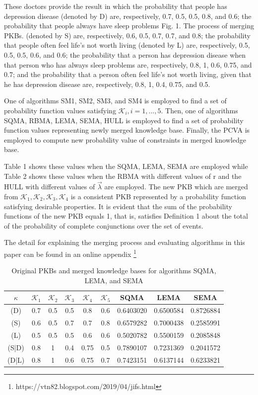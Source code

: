 \documentclass[]{iosart2c}
\begin{document}
  These doctors provide the result in which the probability that people has depression disease (denoted by D) are, respectively, 0.7, 0.5, 0.5, 0.8, and 0.6; the probability that people always have sleep problems Fig. 1. The process of merging PKBs.
  (denoted by S) are, respectively, 0.6, 0.5, 0.7, 0.7, and 0.8; the probability that people often feel life’s not worth living (denoted by L) are, respectively, 0.5, 0.5, 0.5, 0.6, and 0.6; the probability that a person has depression disease when that person who has always sleep problems are, respectively, 0.8, 1, 0.6, 0.75, and 0.7; and the probability that a person often feel life’s not worth living, given that he has depression disease are, respectively, 0.8, 1, 0.4, 0.75, and 0.5.

  One of algorithms SM1, SM2, SM3, and SM4 is employed to find a set of probability function values satisfying $\mathcal{K}_i, i = 1, ..., 5$. Then, one of algorithms SQMA, RBMA, LEMA, SEMA, HULL is employed to find a set of probability function values representing newly merged knowledge base. Finally, the PCVA is employed to compute new probability value of constraints in merged knowledge base.

  Table 1 shows these values when the SQMA, LEMA, SEMA are employed while Table 2 shows these values when the RBMA with different values of r and the HULL with different values of $\vec{\lambda}$ are employed. The new PKB which are merged from $\mathcal{K}_1,\mathcal{K}_2,\mathcal{K}_3,\mathcal{K}_4$ is a consistent PKB represented by a probability function satisfying desirable properties. It is evident that the sum of the probability functions of the new PKB equals 1, that is, satisfies Definition 1 about the total of the probability of complete conjunctions over the set of events.

  The detail for explaining the merging process and evaluating algorithms in this paper can be found in an online appendix \footnote{https://vtn82.blogspot.com/2019/04/jifs.html}



  \begin{table}
    \caption{Original PKBs and merged knowledge bases for algorithms SQMA, LEMA, and SEMA}
    \begin{tabular}{c c c c c c c c c }
      \hline
      $\kappa$ & $\mathcal{K}_1$ & $\mathcal{K}_2$ & $\mathcal{K}_3$ & $\mathcal{K}_4$ & $\mathcal{K}_5$
      & SQMA
      & LEMA
      & SEMA
      \\
      \hline
      (D)   & 0.7 & 0.5 & 0.5 & 0.8  & 0.6 & 0.6403020 & 0.6500584 & 0.8726884 \\
      (S)   & 0.6 & 0.5 & 0.7 & 0.7  & 0.8 & 0.6579282 & 0.7000438 & 0.2585991 \\
      (L)   & 0.5 & 0.5 & 0.5 & 0.6  & 0.6 & 0.5020782 & 0.5500159 & 0.2085848 \\
      (S|D) & 0.8 & 1   & 0.4 & 0.75 & 0.5 & 0.7890107 & 0.7231369 & 0.2041572 \\
      (D|L) & 0.8 & 1   & 0.6 & 0.75 & 0.7 & 0.7423151 & 0.6137144 & 0.6233821 \\
      \hline
    \end{tabular}
  \end{table}
\end{document}
